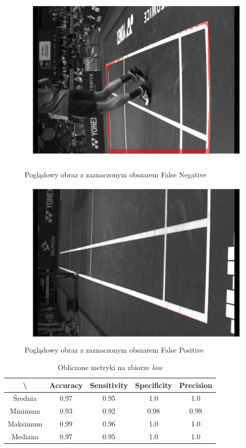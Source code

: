 \begin{figure}[!htb]
    \includegraphics[width=\linewidth]{56_fn_1564911595553287247.jpg}
    \caption{Poglądowy obraz z zaznaczonym obszarem False Negative}
  \endminipage\hfill
    \includegraphics[width=\linewidth]{56_fp_1564953159296706208_5.jpg}
    \caption{Poglądowy obraz z zaznaczonym obszarem False Positive}
  \endminipage\hfill
\end{figure}

\vspace{1cm}

\begin{table}[!h]
	\centering
	\caption{Obliczone metryki na zbiorze \textit{low}}
	\vspace{6pt}
	{\footnotesize
		\begin{tabular}{|c|c|c|c|c|}
			\hline \textbackslash & Accuracy & Sensitivity & Specificity & Precision \\
      \hline Średnia & 0.97 & 0.95 & 1.0 & 1.0 \\
      \hline Minimum & 0.93 & 0.92 & 0.98 & 0.98 \\
      \hline Maksimum & 0.99 & 0.96 & 1.0 & 1.0 \\
      \hline Mediana & 0.97 & 0.95 & 1.0 & 1.0 \\
      \hline
		\end{tabular}
	}
	\vspace{0pt}
\end{table}
